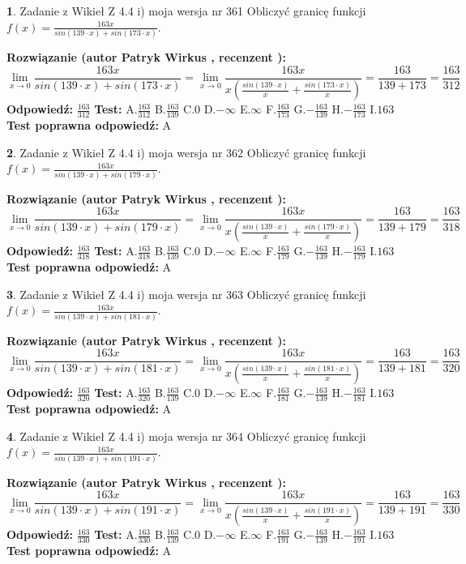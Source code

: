 \documentclass[12pt, a4paper]{article}
\theoremstyle{definition} %
\newtheorem{zad}{}
\newcommand{\zadStart}[1]{\begin{zad}#1\newline}
\newcommand{\zadStop}{\end{zad}}
\newcommand{\rozwStart}[2]{\noindent \textbf{Rozwiązanie (autor #1 , recenzent #2): }\newline}
\newcommand{\rozwStop}{\newline}
\newcommand{\odpStart}{\noindent \textbf{Odpowiedź:}\newline}
\newcommand{\odpStop}{\newline}
\newcommand{\testStart}{\noindent \textbf{Test:}\newline}
\newcommand{\testStop}{\newline}
\newcommand{\kluczStart}{\noindent \textbf{Test poprawna odpowiedź:}\newline}
\newcommand{\kluczStop}{\newline}
\begin{document}
\zadStart{Zadanie z Wikieł Z 4.4 i) moja wersja nr 361}
Obliczyć granicę funkcji $f(x)=\frac{163x}{sin(139\cdot x) +sin(173\cdot x)}$.
\zadStop
\rozwStart{Patryk Wirkus}{}
$$\lim\limits_{x\to 0}\frac{163x}{sin(139\cdot x) +sin(173\cdot x)}=\lim\limits_{x\to 0}\frac{163x}{x(\frac{sin(139\cdot x)}{x}+\frac{sin(173\cdot x)}{x})}=\frac{163}{139+173} = \frac{163}{312}$$
\rozwStop
\odpStart
$\frac{163}{312}$
\odpStop
\testStart
A.$\frac{163}{312}$
B.$\frac{163}{139}$
C.$0$
D.$-\infty$
E.$\infty$
F.$\frac{163}{173}$
G.$-\frac{163}{139}$
H.$-\frac{163}{173}$
I.$163$
\testStop
\kluczStart
A
\kluczStop



\zadStart{Zadanie z Wikieł Z 4.4 i) moja wersja nr 362}
Obliczyć granicę funkcji $f(x)=\frac{163x}{sin(139\cdot x) +sin(179\cdot x)}$.
\zadStop
\rozwStart{Patryk Wirkus}{}
$$\lim\limits_{x\to 0}\frac{163x}{sin(139\cdot x) +sin(179\cdot x)}=\lim\limits_{x\to 0}\frac{163x}{x(\frac{sin(139\cdot x)}{x}+\frac{sin(179\cdot x)}{x})}=\frac{163}{139+179} = \frac{163}{318}$$
\rozwStop
\odpStart
$\frac{163}{318}$
\odpStop
\testStart
A.$\frac{163}{318}$
B.$\frac{163}{139}$
C.$0$
D.$-\infty$
E.$\infty$
F.$\frac{163}{179}$
G.$-\frac{163}{139}$
H.$-\frac{163}{179}$
I.$163$
\testStop
\kluczStart
A
\kluczStop



\zadStart{Zadanie z Wikieł Z 4.4 i) moja wersja nr 363}
Obliczyć granicę funkcji $f(x)=\frac{163x}{sin(139\cdot x) +sin(181\cdot x)}$.
\zadStop
\rozwStart{Patryk Wirkus}{}
$$\lim\limits_{x\to 0}\frac{163x}{sin(139\cdot x) +sin(181\cdot x)}=\lim\limits_{x\to 0}\frac{163x}{x(\frac{sin(139\cdot x)}{x}+\frac{sin(181\cdot x)}{x})}=\frac{163}{139+181} = \frac{163}{320}$$
\rozwStop
\odpStart
$\frac{163}{320}$
\odpStop
\testStart
A.$\frac{163}{320}$
B.$\frac{163}{139}$
C.$0$
D.$-\infty$
E.$\infty$
F.$\frac{163}{181}$
G.$-\frac{163}{139}$
H.$-\frac{163}{181}$
I.$163$
\testStop
\kluczStart
A
\kluczStop



\zadStart{Zadanie z Wikieł Z 4.4 i) moja wersja nr 364}
Obliczyć granicę funkcji $f(x)=\frac{163x}{sin(139\cdot x) +sin(191\cdot x)}$.
\zadStop
\rozwStart{Patryk Wirkus}{}
$$\lim\limits_{x\to 0}\frac{163x}{sin(139\cdot x) +sin(191\cdot x)}=\lim\limits_{x\to 0}\frac{163x}{x(\frac{sin(139\cdot x)}{x}+\frac{sin(191\cdot x)}{x})}=\frac{163}{139+191} = \frac{163}{330}$$
\rozwStop
\odpStart
$\frac{163}{330}$
\odpStop
\testStart
A.$\frac{163}{330}$
B.$\frac{163}{139}$
C.$0$
D.$-\infty$
E.$\infty$
F.$\frac{163}{191}$
G.$-\frac{163}{139}$
H.$-\frac{163}{191}$
I.$163$
\testStop
\kluczStart
A
\kluczStop
\end{document}
